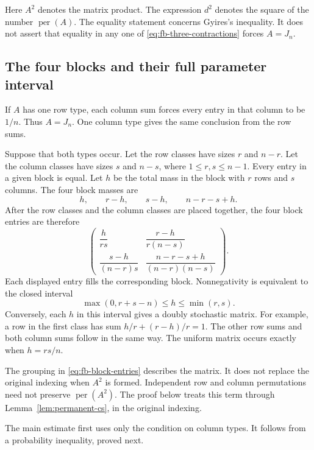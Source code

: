 \documentclass[11pt,a4paper]{article}
\theoremstyle{definition}
\theoremstyle{remark}
\newcommand{\per}{\operatorname{per}}
\begin{document}
Here $A^2$ denotes the matrix product. The expression $d^2$ denotes
the square of the number $\per(A)$. The equality statement concerns
Gyires's inequality. It does not assert that equality in any one of
\eqref{eq:fb-three-contractions} forces $A=J_n$.

\subsection{The four blocks and their full parameter interval}

If $A$ has one row type, each column sum forces every entry in that
column to be $1/n$. Thus $A=J_n$. One column type gives the same
conclusion from the row sums.

Suppose that both types occur. Let the row classes have sizes $r$ and
$n-r$. Let the column classes have sizes $s$ and $n-s$, where
$1\leq r,s\leq n-1$. Every entry in a given block is equal. Let $h$
be the total mass in the block with $r$ rows and $s$ columns.
The four block masses are
\[
 h,\qquad r-h,\qquad s-h,\qquad n-r-s+h.
\]
After the row classes and the column classes are placed together, the
four block entries are therefore
\begin{equation}\label{eq:fb-block-entries}
 \begin{pmatrix}
 \dfrac{h}{rs} & \dfrac{r-h}{r(n-s)}\\[6pt]
 \dfrac{s-h}{(n-r)s} &
 \dfrac{n-r-s+h}{(n-r)(n-s)}
 \end{pmatrix}.
\end{equation}
Each displayed entry fills the corresponding block. Nonnegativity is
equivalent to the closed interval
\begin{equation}\label{eq:fb-h-interval}
 \max(0,r+s-n)\leq h\leq\min(r,s).
\end{equation}
Conversely, each $h$ in this interval gives a doubly stochastic matrix.
For example, a row in the first class has sum
$h/r+(r-h)/r=1$. The other row sums and both column sums follow in the
same way. The uniform matrix occurs exactly when $h=rs/n$.

The grouping in \eqref{eq:fb-block-entries} describes the matrix.
It does not replace the original indexing when $A^2$ is formed.
Independent row and column permutations need not preserve
$\per(A^2)$. The proof below treats this term through
Lemma~\ref{lem:permanent-cs}, in the original indexing.

The main estimate first uses only the condition on column types.
It follows from a probability inequality, proved next.
\end{document}
